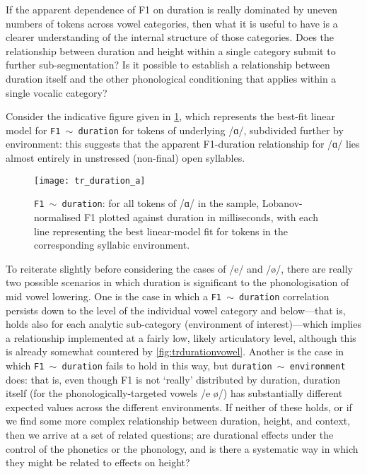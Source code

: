 If the apparent dependence of F1 on duration is really dominated by uneven numbers of tokens across vowel categories, then what it is useful to have is a clearer understanding of the internal structure of those categories. Does the relationship between duration and height within a single category submit to further sub-segmentation? Is it possible to establish a relationship between duration itself and the other phonological conditioning that applies within a single vocalic category?

Consider the indicative figure given in \cref{fig:trdurationa}, which represents the best-fit linear model for \texttt{F1 $\sim$ duration} for tokens of underlying /ɑ/, subdivided further by environment: this suggests that the apparent F1-duration relationship for /ɑ/ lies almost entirely in unstressed (non-final) open syllables.

\begin{figure}[H]
  \centering
  \texttt{[image: tr\_duration\_a]}
  \caption[\texttt{F1 $\sim$ duration} correlation for /ɑ/, split by environment.]{\texttt{F1 $\sim$ duration}: for all tokens of /ɑ/ in the sample, Lobanov-normalised F1 plotted against duration in milliseconds, with each line representing the best linear-model fit for tokens in the corresponding syllabic environment.}
  \label{fig:trdurationa}
\end{figure}

To reiterate slightly before considering the cases of /e/ and /ø/, there are really two possible scenarios in which duration is significant to the phonologisation of mid vowel lowering. One is the case in which a \texttt{F1 $\sim$ duration} correlation persists down to the level of the individual vowel category and below---that is, holds also for each analytic sub-category (environment of interest)---which implies a relationship implemented at a fairly low, likely articulatory level, although this is already somewhat countered by \cref{fig:trdurationvowel}. Another is the case in which \texttt{F1 $\sim$ duration} fails to hold in this way, but \texttt{duration $\sim$ environment} does: that is, even though F1 is not `really' distributed by duration, duration itself (for the phonologically-targeted vowels /e ø/) has substantially different expected values across the different environments. If neither of these holds, or if we find some more complex relationship between duration, height, and context, then we arrive at a set of related questions; are durational effects under the control of the phonetics or the phonology, and is there a systematic way in which they might be related to effects on height?

